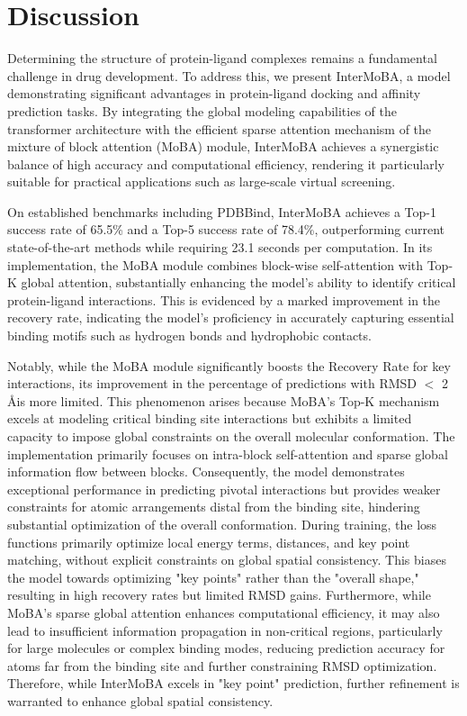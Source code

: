 \documentclass[11pt,a4paper]{article}
\begin{document}
\section{Discussion}
Determining the structure of protein-ligand complexes remains a fundamental challenge in drug development. To address this, we present InterMoBA, a model demonstrating significant advantages in protein-ligand docking and affinity prediction tasks. By integrating the global modeling capabilities of the transformer\cite{vaswani2017attention} architecture with the efficient sparse attention mechanism of the mixture of block attention (MoBA) module, InterMoBA achieves a synergistic balance of high accuracy and computational efficiency, rendering it particularly suitable for practical applications such as large-scale virtual screening.

On established benchmarks including PDBBind, InterMoBA achieves a Top-1 success rate of 65.5\% and a Top-5 success rate of 78.4\%, outperforming current state-of-the-art methods while requiring 23.1 seconds per computation. In its implementation, the MoBA module combines block-wise self-attention with Top-K global attention, substantially enhancing the model's ability to identify critical protein-ligand interactions. This is evidenced by a marked improvement in the recovery rate, indicating the model's proficiency in accurately capturing essential binding motifs such as hydrogen bonds and hydrophobic contacts.

Notably, while the MoBA module significantly boosts the Recovery Rate for key interactions, its improvement in the percentage of predictions with RMSD $<$ 2 \AA is more limited. This phenomenon arises because MoBA's Top-K mechanism excels at modeling critical binding site interactions but exhibits a limited capacity to impose global constraints on the overall molecular conformation. The implementation primarily focuses on intra-block self-attention and sparse global information flow between blocks. Consequently, the model demonstrates exceptional performance in predicting pivotal interactions but provides weaker constraints for atomic arrangements distal from the binding site, hindering substantial optimization of the overall conformation. During training, the loss functions primarily optimize local energy terms, distances, and key point matching, without explicit constraints on global spatial consistency. This biases the model towards optimizing "key points" rather than the "overall shape," resulting in high recovery rates but limited RMSD gains. Furthermore, while MoBA's sparse global attention enhances computational efficiency, it may also lead to insufficient information propagation in non-critical regions, particularly for large molecules or complex binding modes, reducing prediction accuracy for atoms far from the binding site and further constraining RMSD optimization. Therefore, while InterMoBA excels in "key point" prediction, further refinement is warranted to enhance global spatial consistency.
\end{document}
